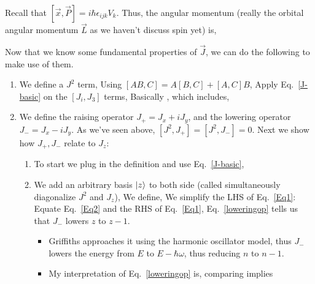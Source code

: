 \documentclass{school-22.101-notes}
\begin{document}
Recall that $[\vec{x}, \vec{P} ] = i \hbar \epsilon_{ijk} V_k$. Thus, the angular momentum (really the orbital angular momentum $\vec{L}$ as we haven't discuss spin yet) is, 

\clearpage
Now that we know some fundamental properties of $\vec{J}$, we can do the following to make use of them.
\begin{enumerate}
\item We define a $J^2$ term,
  Using $[AB,C] = A[B,C] + [A,C] B$, 
  Apply Eq.~\ref{J-basic} on the $[J_i, J_3]$ terms,
  Basically , 
  which includes, 

\item We define the raising operator $J_+ = J_x + iJ_y$, and the lowering operator $J_- = J_x - iJ_y$. As we've seen above, $[J^2, J_+] = [J^2, J_-] = 0$. Next we show how $J_+, J_-$ relate to $J_z$: 
  \begin{enumerate}
  \item To start we plug in the definition and use Eq.~\ref{J-basic}, 


  \item We add an arbitrary basis $\left| z \right>$ to both side (called simultaneously diagonalize $J^2$ and $J_z$),  
    We define, 
    We simplify the LHS of Eq.~\ref{Eq1}: 
    Equate Eq.~\ref{Eq2} and the RHS of Eq.~\ref{Eq1}, 
    Eq.~\ref{loweringop} tells us that $J_-$ lowers $z$ to $z-1$. 
    \begin{itemize}
    \item Griffiths approaches it using the harmonic oscillator model, thus $J_-$ lowers the energy from $E$ to $E-\hbar \omega$, thus reducing $n$ to $n-1$. 
    \item My interpretation of  Eq.~\ref{loweringop} is, comparing 
      implies 
    \end{itemize}


\end{enumerate}
\end{enumerate}
\end{document}
